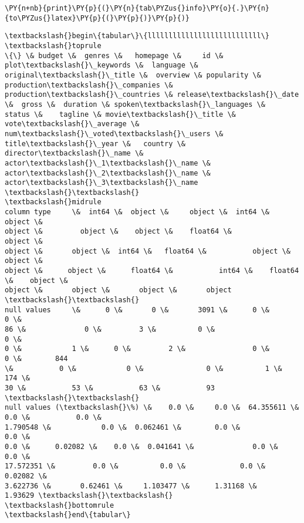     \begin{tcolorbox}[breakable, size=fbox, boxrule=1pt, pad at break*=1mm,colback=cellbackground, colframe=cellborder]
\begin{Verbatim}[commandchars=\\\{\}]
\PY{n+nb}{print}\PY{p}{(}\PY{n}{tab\PYZus{}info}\PY{o}{.}\PY{n}{to\PYZus{}latex}\PY{p}{(}\PY{p}{)}\PY{p}{)}
\end{Verbatim}
\end{tcolorbox}

    \begin{Verbatim}[commandchars=\\\{\}]
\textbackslash{}begin\{tabular\}\{lllllllllllllllllllllllllll\}
\textbackslash{}toprule
\{\} \& budget \&  genres \&   homepage \&     id \& plot\textbackslash{}\_keywords \&  language \&
original\textbackslash{}\_title \&  overview \& popularity \& production\textbackslash{}\_companies \&
production\textbackslash{}\_countries \& release\textbackslash{}\_date \&  gross \&  duration \& spoken\textbackslash{}\_languages \&
status \&    tagline \& movie\textbackslash{}\_title \& vote\textbackslash{}\_average \& num\textbackslash{}\_voted\textbackslash{}\_users \&
title\textbackslash{}\_year \&   country \& director\textbackslash{}\_name \& actor\textbackslash{}\_1\textbackslash{}\_name \& actor\textbackslash{}\_2\textbackslash{}\_name \&
actor\textbackslash{}\_3\textbackslash{}\_name \textbackslash{}\textbackslash{}
\textbackslash{}midrule
column type     \&  int64 \&  object \&     object \&  int64 \&        object \&
object \&         object \&    object \&    float64 \&               object \&
object \&       object \&  int64 \&   float64 \&           object \&  object \&
object \&      object \&      float64 \&           int64 \&    float64 \&    object \&
object \&       object \&       object \&       object \textbackslash{}\textbackslash{}
null values     \&      0 \&       0 \&       3091 \&      0 \&             0 \&
86 \&              0 \&         3 \&          0 \&                    0 \&
0 \&            1 \&      0 \&         2 \&                0 \&       0 \&        844
\&           0 \&            0 \&               0 \&          1 \&       174 \&
30 \&           53 \&           63 \&           93 \textbackslash{}\textbackslash{}
null values (\textbackslash{}\%) \&    0.0 \&     0.0 \&  64.355611 \&    0.0 \&           0.0 \&
1.790548 \&            0.0 \&  0.062461 \&        0.0 \&                  0.0 \&
0.0 \&      0.02082 \&    0.0 \&  0.041641 \&              0.0 \&     0.0 \&
17.572351 \&         0.0 \&          0.0 \&             0.0 \&    0.02082 \&
3.622736 \&       0.62461 \&     1.103477 \&      1.31168 \&      1.93629 \textbackslash{}\textbackslash{}
\textbackslash{}bottomrule
\textbackslash{}end\{tabular\}

    \end{Verbatim}

